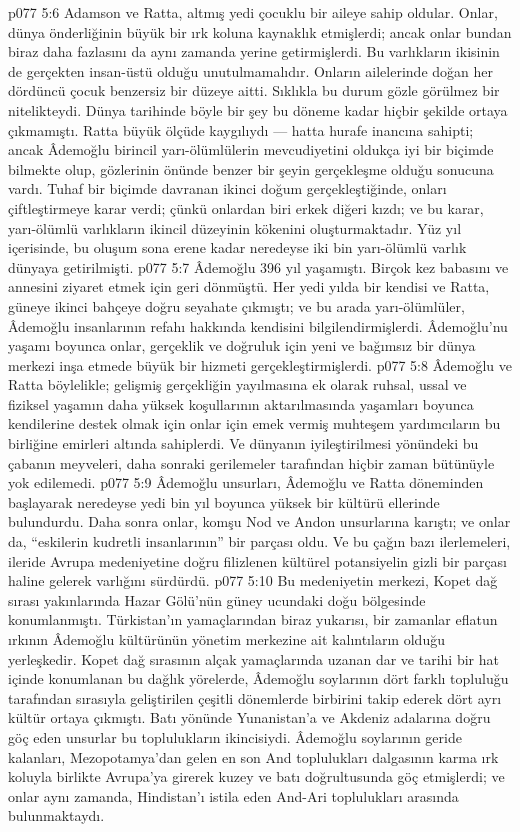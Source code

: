 \vs p077 5:6 Adamson ve Ratta, altmış yedi çocuklu bir aileye sahip oldular. Onlar, dünya önderliğinin büyük bir ırk koluna kaynaklık etmişlerdi; ancak onlar bundan biraz daha fazlasını da aynı zamanda yerine getirmişlerdi. Bu varlıkların ikisinin de gerçekten insan\hyp{}üstü olduğu unutulmamalıdır. Onların ailelerinde doğan her dördüncü çocuk benzersiz bir düzeye aitti. Sıklıkla bu durum gözle görülmez bir nitelikteydi. Dünya tarihinde böyle bir şey bu döneme kadar hiçbir şekilde ortaya çıkmamıştı. Ratta büyük ölçüde kaygılıydı --- hatta hurafe inancına sahipti; ancak Âdemoğlu birincil yarı\hyp{}ölümlülerin mevcudiyetini oldukça iyi bir biçimde bilmekte olup, gözlerinin önünde benzer bir şeyin gerçekleşme olduğu sonucuna vardı. Tuhaf bir biçimde davranan ikinci doğum gerçekleştiğinde, onları çiftleştirmeye karar verdi; çünkü onlardan biri erkek diğeri kızdı; ve bu karar, yarı\hyp{}ölümlü varlıkların ikincil düzeyinin kökenini oluşturmaktadır. Yüz yıl içerisinde, bu oluşum sona erene kadar neredeyse iki bin yarı\hyp{}ölümlü varlık dünyaya getirilmişti.
\vs p077 5:7 Âdemoğlu 396 yıl yaşamıştı. Birçok kez babasını ve annesini ziyaret etmek için geri dönmüştü. Her yedi yılda bir kendisi ve Ratta, güneye ikinci bahçeye doğru seyahate çıkmıştı; ve bu arada yarı\hyp{}ölümlüler, Âdemoğlu insanlarının refahı hakkında kendisini bilgilendirmişlerdi. Âdemoğlu’nu yaşamı boyunca onlar, gerçeklik ve doğruluk için yeni ve bağımsız bir dünya merkezi inşa etmede büyük bir hizmeti gerçekleştirmişlerdi.
\vs p077 5:8 Âdemoğlu ve Ratta böylelikle; gelişmiş gerçekliğin yayılmasına ek olarak ruhsal, ussal ve fiziksel yaşamın daha yüksek koşullarının aktarılmasında yaşamları boyunca kendilerine destek olmak için onlar için emek vermiş muhteşem yardımcıların bu birliğine emirleri altında sahiplerdi. Ve dünyanın iyileştirilmesi yönündeki bu çabanın meyveleri, daha sonraki gerilemeler tarafından hiçbir zaman bütünüyle yok edilemedi.
\vs p077 5:9 Âdemoğlu unsurları, Âdemoğlu ve Ratta döneminden başlayarak neredeyse yedi bin yıl boyunca yüksek bir kültürü ellerinde bulundurdu. Daha sonra onlar, komşu Nod ve Andon unsurlarına karıştı; ve onlar da, “eskilerin kudretli insanlarının” bir parçası oldu. Ve bu çağın bazı ilerlemeleri, ileride Avrupa medeniyetine doğru filizlenen kültürel potansiyelin gizli bir parçası haline gelerek varlığını sürdürdü.
\vs p077 5:10 Bu medeniyetin merkezi, Kopet dağ sırası yakınlarında Hazar Gölü’nün güney ucundaki doğu bölgesinde konumlanmıştı. Türkistan’ın yamaçlarından biraz yukarısı, bir zamanlar eflatun ırkının Âdemoğlu kültürünün yönetim merkezine ait kalıntıların olduğu yerleşkedir. Kopet dağ sırasının alçak yamaçlarında uzanan dar ve tarihi bir hat içinde konumlanan bu dağlık yörelerde, Âdemoğlu soylarının dört farklı topluluğu tarafından sırasıyla geliştirilen çeşitli dönemlerde birbirini takip ederek dört ayrı kültür ortaya çıkmıştı. Batı yönünde Yunanistan’a ve Akdeniz adalarına doğru göç eden unsurlar bu toplulukların ikincisiydi. Âdemoğlu soylarının geride kalanları, Mezopotamya’dan gelen en son And toplulukları dalgasının karma ırk koluyla birlikte Avrupa’ya girerek kuzey ve batı doğrultusunda göç etmişlerdi; ve onlar aynı zamanda, Hindistan’ı istila eden And\hyp{}Ari toplulukları arasında bulunmaktaydı.
